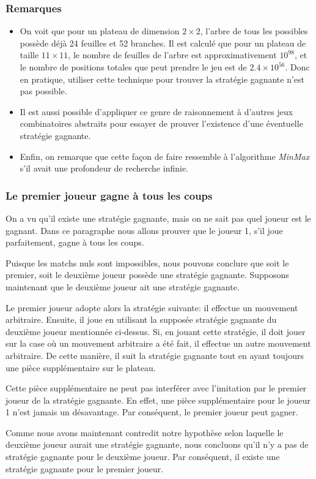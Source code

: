 \subsubsection{Remarques}
\begin{itemize}
    \item On voit que pour un plateau de dimension $2\times2$, l'arbre de tous les possibles possède déjà 24 feuilles et 52 branches.
    Il est calculé que pour un plateau de taille $11\times11$, le nombre de feuilles de l'arbre est
    approximativement $10^{98}$, et le nombre de positions totales que peut prendre le jeu est de $2.4\times10^{56}$.
    Donc en pratique, utiliser cette technique pour trouver la stratégie gagnante n'est pas possible.
    \item Il est aussi possible d'appliquer ce genre de raisonnement à d'autres jeux combinatoires abstraits pour essayer de
    prouver l'existence d'une éventuelle stratégie gagnante.
    \item Enfin, on remarque que cette façon de faire ressemble à l'algorithme \emph{MinMax} s'il avait une profondeur de recherche
    infinie.
\end{itemize}

\subsubsection{Le premier joueur gagne à tous les coups}
On a vu qu'il existe une stratégie gagnante, mais on ne sait pas quel joueur est le gagnant. Dans ce paragraphe nous allons
prouver que le joueur 1, s'il joue parfaitement, gagne à tous les coups.

Puisque les matchs nuls sont impossibles, nous pouvons conclure que soit le premier, soit le deuxième joueur possède une stratégie
gagnante. Supposons maintenant que le deuxième joueur ait une stratégie gagnante.

Le premier joueur adopte alors la stratégie suivante: il effectue un mouvement arbitraire. Ensuite, 
il joue en utilisant la supposée stratégie gagnante du deuxième joueur mentionnée ci-dessus. Si,
en jouant cette stratégie, il doit jouer sur la case où un mouvement arbitraire a été fait, il effectue
un autre mouvement arbitraire. De cette manière, il suit la stratégie gagnante tout en ayant toujours une pièce
supplémentaire sur le plateau.

Cette pièce supplémentaire ne peut pas interférer avec l'imitation par le premier joueur de la stratégie gagnante.
En effet, une pièce supplémentaire pour le joueur 1 n'est jamais un désavantage. Par conséquent, le premier joueur peut
gagner.

Comme nous avons maintenant contredit notre hypothèse selon laquelle le deuxième joueur aurait une stratégie gagnante,
nous concluons qu'il n'y a pas de stratégie gagnante pour le deuxième joueur.
Par conséquent, il existe une stratégie gagnante pour le premier joueur.